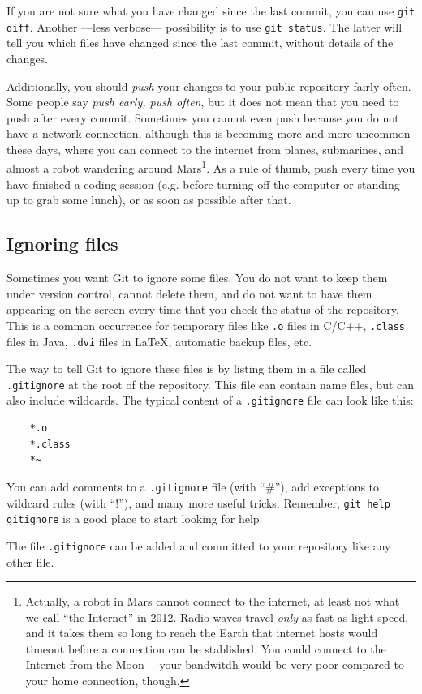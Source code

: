 If you are not sure what you have changed since the last commit, 
you can use \verb+git diff+. Another ---less verbose--- possibility
is to use \verb+git status+. The latter will tell you
which files have changed since the last commit, without details of the
changes.

Additionally, you should \emph{push} your changes to your public
repository fairly often. Some people say \emph{push early, push
  often}, but it does not mean that you need to push after every
commit. Sometimes 
you cannot even push because you do not have a network connection,
although this is becoming more and more uncommon these days, where you
can connect to the internet from planes, submarines, and almost a
robot wandering around Mars\footnote{Actually, a robot in Mars cannot
  connect to the internet, at least not what we call ``the Internet'' in
  2012. Radio waves travel \emph{only} as fast as light-speed, and it
  takes them so long to reach the Earth that internet hosts would
  timeout before a connection can be stablished. You could connect to
  the Internet from the Moon ---your bandwitdh would be
  very poor compared to your home connection, though.}. 
As a rule of thumb, push every time you 
have finished a coding session (e.g. before turning off the computer
or standing up to grab some lunch), or as soon as possible after that.


\subsection{Ignoring files}
\label{sec:ignoring-files}

Sometimes you want Git to ignore some files. You do not want to keep
them under version control, cannot delete them, and do not want to
have them appearing on the screen every time that you check the status
of the repository. This is a common occurrence for temporary files
like \verb+.o+ files in C/C++, \verb+.class+ files in Java,
\verb+.dvi+ files in \LaTeX, automatic backup files, etc.

The way to tell Git to ignore these files is by listing them in a file
called \verb+.gitignore+ at the root of the repository. This file can
contain name files, but can also include wildcards. The typical
content of a \verb+.gitignore+ file can look like this:

\begin{verbatim}
    *.o
    *.class
    *~
\end{verbatim}

You can add comments to a \verb+.gitignore+ file (with ``\#''), add
exceptions to wildcard rules (with ``!''), and many more useful
tricks. Remember, \verb+git help gitignore+ is a good place to start
looking for help. 

The file \verb+.gitignore+ can be added and committed to your
repository like any other file.





